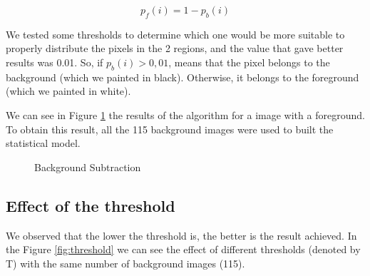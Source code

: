 \documentclass{article}
\begin{document}
	\begin{equation}
	 p_f(i)=1-p_b(i)  
	\end{equation}

	We tested some thresholds to determine which one would be more suitable to properly distribute the pixels in the 2 regions, and the value that gave better results was 0.01. So, if {$p_b(i)>0,01$}, means that the pixel belongs to the background (which we painted in black). Otherwise, it belongs to the foreground (which we painted in white). 

	We can see in Figure \ref{fig:img_000053} the results of the algorithm for a image with a foreground. To obtain this result, all the 115 background images were used to built the statistical model.

	\begin{figure}[H]
		  \centering
		  \caption{Background Subtraction}
		  \label{fig:img_000053}
	\end{figure}

\subsection{Effect of the threshold}

	We observed that the lower the threshold is, the better is the result achieved. In the Figure \ref{fig:threshold} we can see the effect of different thresholds (denoted by T) with the same number of background images (115).
\end{document}
